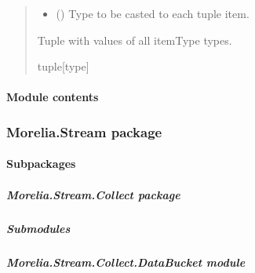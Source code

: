 \documentclass[letterpaper,10pt,english]{sphinxmanual}
\begin{document}
\begin{fulllineitems}
\begin{fulllineitems}
\begin{quote}
\begin{description}
\begin{itemize}
\item {} 
\sphinxAtStartPar
{} () \textendash{} Type to be casted to each tuple item.

\end{itemize}

\sphinxAtStartPar
Tuple with values of all itemType types.

\sphinxAtStartPar
tuple{[}type{]}

\end{description}\end{quote}

\end{fulllineitems}


\end{fulllineitems}



\paragraph{Module contents}
\label{\detokenize{Morelia.Parameters:module-Morelia.Parameters}}\label{\detokenize{Morelia.Parameters:module-contents}}
\sphinxstepscope


\subsubsection{Morelia.Stream package}
\label{\detokenize{Morelia.Stream:morelia-stream-package}}\label{\detokenize{Morelia.Stream::doc}}

\paragraph{Subpackages}
\label{\detokenize{Morelia.Stream:subpackages}}
\sphinxstepscope


\subparagraph{Morelia.Stream.Collect package}
\label{\detokenize{Morelia.Stream.Collect:morelia-stream-collect-package}}\label{\detokenize{Morelia.Stream.Collect::doc}}

\subparagraph{Submodules}
\label{\detokenize{Morelia.Stream.Collect:submodules}}

\subparagraph{Morelia.Stream.Collect.DataBucket module}
\label{\detokenize{Morelia.Stream.Collect:module-Morelia.Stream.Collect.DataBucket}}\label{\detokenize{Morelia.Stream.Collect:morelia-stream-collect-databucket-module}}
\end{document}
